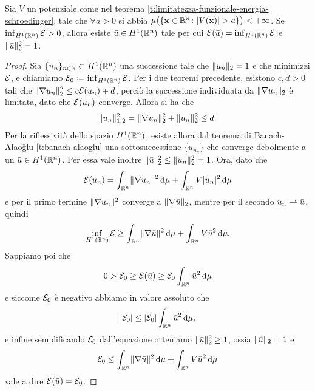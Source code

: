 \begin{teorema} \label{t:esistenza-soluzione-debole-schroedinger}
    Sia $V$ un potenziale come nel teorema \ref{t:limitatezza-funzionale-energia-schroedinger}, tale che $\forall a>0$ si abbia $\mu\bigl(\{\vec x\in\R^n\colon\abs{V(\vec x)}>a\}\bigr)<+\infty$.
    Se $\inf_{\sobH[1]{\R^n}}\E>0$, allora esiste $\bar{u}\in\sobH[1]{\R^n}$ tale per cui $\E(\bar{u})=\inf_{\sobH[1]{\R^n}}\E$ e $\norm{\bar{u}}_2^2=1$.
\end{teorema}
\begin{proof}
    Sia $\{u_n\}_{n\in\N}\subset\sobH[1]{\R^n}$ una successione tale che $\norm{u_n}_2=1$ e che minimizzi $\E$, e chiamiamo $\E_0\defeq\inf_{\sobH[1]{\R^n}}\E$.
    Per i due teoremi precedente, esistono $c,d>0$ tali che $\norm{\grad u_n}_2^2\le c\E(u_n)+d$, perciò la successione individuata da $\norm{\grad u_n}_2$ è limitata, dato che $\E(u_n)$ converge.
    Allora si ha che
    \begin{equation}
        \norm{u_n}_{1,2}^2=\norm{\grad u_n}_2^2+\norm{u_n}_2^2\le d.
    \end{equation}
    Per la riflessività dello spazio $\sobH[1]{\R^n}$, esiste allora dal teorema di Banach-Alao\u{g}lu \ref{t:banach-alaoglu} una sottosuccessione $\{u_{n_k}\}$ che converge debolmente a un $\bar{u}\in\sobH[1]{\R^n}$.
    Per essa vale inoltre $\norm{\bar{u}}_2^2\le\norm{u_n}_2^2=1$.
    Ora, dato che
    \begin{equation}
        \E(u_n)=
        \int_{\R^n}\norm{\grad u_n}^2\,\dd\mu+\int_{\R^n}V\abs{u_n}^2\,\dd\mu
    \end{equation}
    e per il primo termine $\norm{\grad u_n}^2$ converge a $\norm{\grad\bar{u}}_2$, mentre per il secondo $u_n\weakto\bar{u}$, quindi
    \begin{equation}
        \inf_{\sobH[1]{\R^n}}\E\ge
        \int_{\R^n}\norm{\grad\bar{u}}^2\,\dd\mu+\int_{\R^n}V\bar{u}^2\,\dd\mu.
    \end{equation}
    Sappiamo poi che
    \begin{equation}
        0>
        \E_0\ge
        \E(\bar{u})\ge
        \E_0\int_{\R^n}\bar{u}^2\,\dd\mu
    \end{equation}
    e siccome $\E_0$ è negativo abbiamo in valore assoluto che
    \begin{equation}
        \abs{\E_0}\le
        \abs{\E_0}\int_{\R^n}\bar{u}^2\,\dd\mu,
    \end{equation}
    e infine semplificando $\E_0$ dall'equazione otteniamo $\norm{\bar{u}}_2^2\ge 1$, ossia $\norm{\bar{u}}_2=1$ e
    \begin{equation}
        \E_0\le
        \int_{\R^n}\norm{\grad\bar{u}}^2\,\dd\mu+\int_{\R^n}V\bar{u}^2\,\dd\mu
    \end{equation}
    vale a dire $\E(\bar{u})=\E_0$.
\end{proof}
